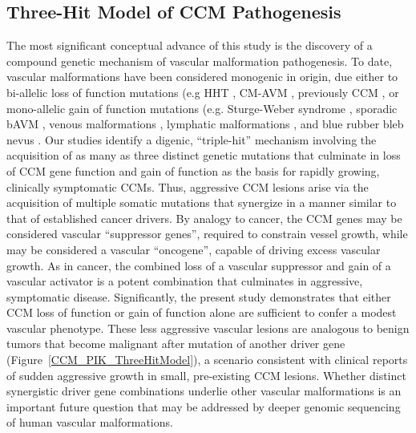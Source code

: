 \subsection{Three-Hit Model of CCM Pathogenesis}
The most significant conceptual advance of this study is the discovery of a compound genetic mechanism of vascular malformation pathogenesis. To date, vascular malformations have been considered monogenic in origin, due either to bi-allelic loss of function mutations (e.g HHT \citep{snellings2019}, CM-AVM \citep{lapinski2018}, previously CCM \citep{akers2009, mcdonald2014}, or mono-allelic gain of function mutations (e.g. Sturge-Weber syndrome \citep{shirley2013}, sporadic bAVM \citep{nikolaev2018}, venous malformations \citep{limaye2015}, lymphatic malformations \citep{luks2015}, and blue rubber bleb nevus \citep{soblet2017, tang2017, goss2019, davis2020, francis2019, couto2017, couto2015}. Our studies identify a digenic, “triple-hit” mechanism involving the acquisition of as many as three distinct genetic mutations that culminate in loss of CCM gene function and gain of  function as the basis for rapidly growing, clinically symptomatic CCMs. Thus, aggressive CCM lesions arise via the acquisition of multiple somatic mutations that synergize in a manner similar to that of established cancer drivers. By analogy to cancer, the CCM genes may be considered vascular “suppressor genes”, required to constrain vessel growth, while  may be considered a vascular “oncogene”, capable of driving excess vascular growth. As in cancer, the combined loss of a vascular suppressor and gain of a vascular activator is a potent combination that culminates in aggressive, symptomatic disease. Significantly, the present study demonstrates that either CCM loss of function or  gain of function alone are sufficient to confer a modest vascular phenotype. These less aggressive vascular lesions are analogous to benign tumors that become malignant after mutation of another driver gene (Figure~\ref{CCM_PIK_ThreeHitModel}), a scenario consistent with clinical reports of sudden aggressive growth in small, pre-existing CCM lesions. Whether distinct synergistic driver gene combinations underlie other vascular malformations is an important future question that may be addressed by deeper genomic sequencing of human vascular malformations. 

